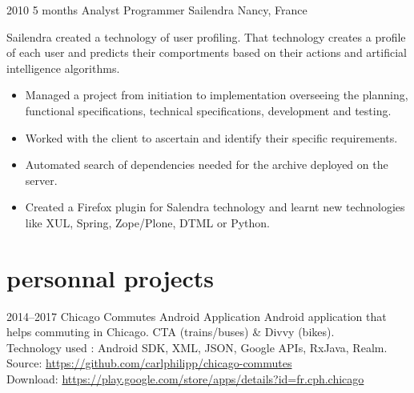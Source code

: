 \documentclass[]{friggeri-cv} %
\begin{document}

\begin{entrylist}

\entry
{2010}
{5 months}
{Analyst Programmer} 
{Sailendra}
{Nancy, France}
{Sailendra created a technology of user profiling. That technology creates a profile of each user and predicts their comportments based on their actions and artificial intelligence algorithms.\\

\vspace{-4mm}
\begin{itemize}
	\item Managed a project from initiation to implementation overseeing the planning, functional specifications, technical specifications, development and testing.
	\item Worked with the client to ascertain and identify their specific requirements.
	\item Automated search of dependencies needed for the archive deployed on the server.
   \item Created a Firefox plugin for Salendra technology and learnt new technologies like XUL, Spring, Zope/Plone, DTML or Python.
\end{itemize}}
\vspace{-7mm}

\end{entrylist}


\section{personnal projects}

\begin{entrylist}

\entry
{2014--2017}
{}
{Chicago Commutes}
{  Android Application}
{}
{Android application that helps commuting in Chicago. CTA (trains/buses) \& Divvy (bikes).\\
Technology used : Android SDK, XML, JSON, Google APIs, RxJava, Realm.\\
\footnotesize{Source: \href{https://github.com/carlphilipp/chicago-commutes}{https://github.com/carlphilipp/chicago-commutes}}\\
\footnotesize{Download: \href{https://play.google.com/store/apps/details?id=fr.cph.chicago}{https://play.google.com/store/apps/details?id=fr.cph.chicago}}}

\end{entrylist}
\end{document}
